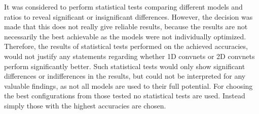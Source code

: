 \newpage



 
It was considered to perform statistical tests comparing different models and ratios to reveal significant or insignificant differences. However, the decision was made that this does not really give reliable results, because the results are not necessarily the best achievable as the models were not individually optimized. Therefore, the results of statistical tests performed on the achieved accuracies, would not justify any statements regarding whether 1D convnets or 2D convnets perform significantly better. Such statistical tests would only show significant differences or indifferences in the results, but could not be interpreted for any valuable findings, as not all models are used to their full potential. For choosing the best configurations from those tested no statistical tests are used. Instead simply those with the highest accuracies are chosen.

